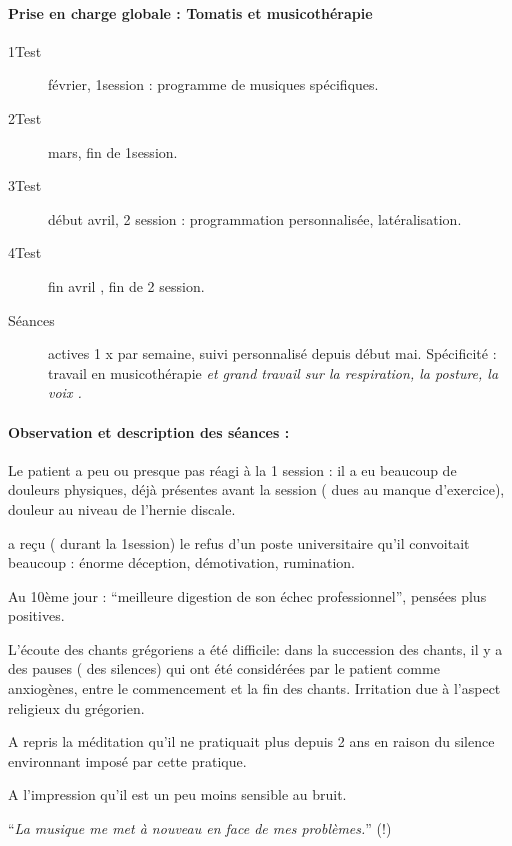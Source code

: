\paragraph{Prise en charge globale : Tomatis et musicothérapie}
\begin{description}
\item [{1\textdegree Test}] février, 1\textdegree session : programme de
musiques spécifiques.
\item [{2\textdegree Test}] mars, fin de 1\textdegree session. 
\item [{3\textdegree Test}] début avril, 2\textdegree{} session : programmation
personnalisée, latéralisation.
\item [{4\textdegree Test}] fin avril , fin de 2\textdegree{} session.
\item [{Séances}] actives 1 x par semaine, suivi personnalisé depuis début
mai.\emph{ }Spécificité : travail en musicothérapie\emph{ et grand
travail sur la respiration, la posture, la voix .}
\end{description}

\paragraph{Observation et description des séances :}

Le patient a peu ou presque pas réagi à la 1\textdegree{} session
: il a eu beaucoup de douleurs physiques, déjà présentes avant la
session ( dues au manque d'exercice), douleur au niveau de l'hernie
discale.

a reçu ( durant la 1\textdegree session) le refus d'un poste universitaire
qu'il convoitait beaucoup : énorme déception, démotivation, rumination.

Au 10ème jour : ``meilleure digestion de son échec professionnel'',
pensées plus positives.

L'écoute des chants grégoriens a été difficile: dans la succession
des chants, il y a des pauses ( des silences) qui ont été considérées
par le patient comme anxiogènes, entre le commencement et la fin des
chants. Irritation due à l'aspect religieux du grégorien.

A repris la méditation qu'il ne pratiquait plus depuis 2 ans en raison
du silence environnant imposé par cette pratique.

A l'impression qu'il est un peu moins sensible au bruit.

``\emph{La musique me met à nouveau en face de mes problèmes.}''
(!)

